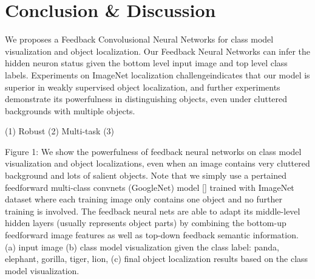 \section{Conclusion \& Discussion}

We proposes a Feedback Convolusional Neural Networks for class model visualization and object localization. 
Our Feedback Neural Networks can infer the hidden neuron status given the bottom level input image and top level class labels.
Experiments on ImageNet localization challengeindicates that our model is superior in weakly supervised object localization, and further experiments demonstrate its powerfulness in distinguishing objects, even under cluttered backgrounds with multiple objects.

(1) Robust 
(2) Multi-task
(3)

Figure 1: We show the powerfulness of feedback neural networks on class model visualization and object localizations, even when an image contains very cluttered background and lots of salient objects. Note that we simply use a pertained feedforward multi-class convnets (GoogleNet) model [] trained with ImageNet dataset where each training image only contains one object and no further training is involved. The feedback neural nets are able to adapt its middle-level hidden layers (usually represents object parts) by combining the bottom-up feedforward image features as well as top-down feedback semantic information. (a) input image (b) class model visualization given the class label: panda, elephant, gorilla, tiger, lion, (c) final object localization results based on the class model visualization.

